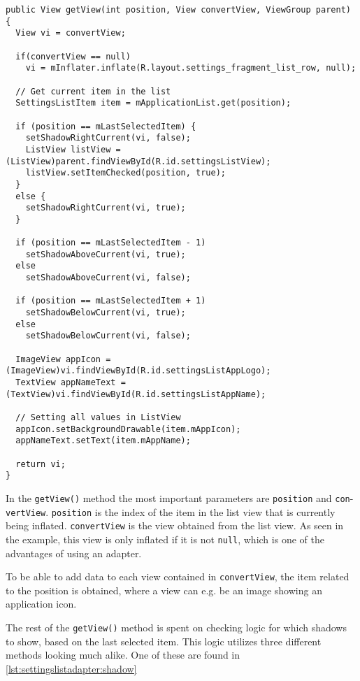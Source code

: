 \begin{lstlisting}[caption={\lstinline|getView()| method in \lstinline|SettingsListAdapter| class.}, label={lst:settingslistadapter:getview}]
public View getView(int position, View convertView, ViewGroup parent) {
  View vi = convertView;
  
  if(convertView == null)
    vi = mInflater.inflate(R.layout.settings_fragment_list_row, null);
  
  // Get current item in the list
  SettingsListItem item = mApplicationList.get(position);
  
  if (position == mLastSelectedItem) {
    setShadowRightCurrent(vi, false);
    ListView listView = (ListView)parent.findViewById(R.id.settingsListView);
    listView.setItemChecked(position, true);
  }
  else {
    setShadowRightCurrent(vi, true);
  }
  
  if (position == mLastSelectedItem - 1)
    setShadowAboveCurrent(vi, true);
  else
    setShadowAboveCurrent(vi, false);
  
  if (position == mLastSelectedItem + 1)
    setShadowBelowCurrent(vi, true);
  else
    setShadowBelowCurrent(vi, false);
  
  ImageView appIcon = (ImageView)vi.findViewById(R.id.settingsListAppLogo);
  TextView appNameText = (TextView)vi.findViewById(R.id.settingsListAppName);
  
  // Setting all values in ListView
  appIcon.setBackgroundDrawable(item.mAppIcon);
  appNameText.setText(item.mAppName);
  
  return vi;
}
\end{lstlisting}

In the \lstinline|getView()| method the most important parameters are \lstinline|position| and \lstinline|con|-\lstinline|vertView|.
\lstinline|position| is the index of the item in the list view that is currently being inflated.
\lstinline|convertView| is the view obtained from the list view.
As seen in the example, this view is only inflated if it is not \lstinline|null|, which is one of the advantages of using an adapter.

To be able to add data to each view contained in \lstinline|convertView|, the item related to the position is obtained, where a view can e.g. be an image showing an application icon.

The rest of the \lstinline|getView()| method is spent on checking logic for which shadows to show, based on the last selected item.
This logic utilizes three different methods looking much alike.
One of these are found in \cref{lst:settingslistadapter:shadow}

